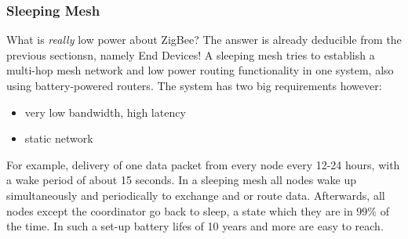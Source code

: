 \subsubsection{Sleeping Mesh}
What is \textit{really} low power about ZigBee? The answer is already deducible from the previous sectionsn, namely End Devices! A sleeping mesh tries to establish a multi-hop mesh network and low power routing functionality in one system, also using battery-powered routers. The system has two big requirements however:
\begin{itemize}
\item very low bandwidth, high latency
\item static network
\end{itemize}
For example, delivery of one data packet from every node every 12-24 hours, with a wake period of about 15 seconds. In a sleeping mesh all nodes wake up simultaneously and periodically to exchange and or route data. Afterwards, all nodes except the coordinator go back to sleep, a state which they are in 99\% of the time. In such a set-up battery lifes of 10 years and more are easy to reach.
